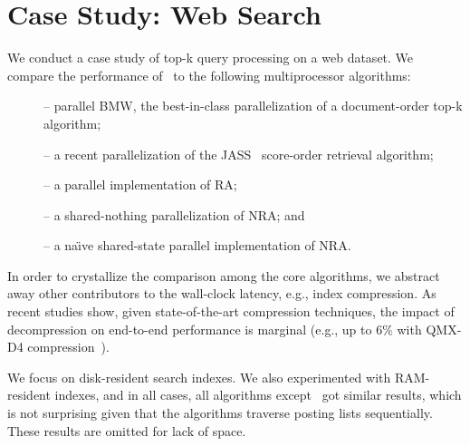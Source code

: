 \section{Case Study: Web Search} \label{sec:eval}

We conduct a case study of top-k query processing on a web dataset. 
We compare the performance of \alg\ to the following multiprocessor algorithms: 
\begin{description}
\item[\pBMW]\cite{rojas2013efficient} -- parallel BMW,  
the best-in-class parallelization of a document-order top-k algorithm; 
\item[\pJASS]\cite{parallel-jass} -- a recent parallelization of the JASS~\cite{Lin:2015} score-order retrieval algorithm; 
\item[\pRA]-- a parallel implementation of RA;
\item[\sNRA]--  a shared-nothing  parallelization of NRA; and 
\item [\pNRA]-- a
na\"{\i}ve shared-state parallel implementation of NRA. 
\end{description}



In order to crystallize the comparison among  the core algorithms, 
we abstract away other contributors to the wall-clock  latency, e.g., index compression. 
As recent studies show, given state-of-the-art compression techniques, the impact 
of decompression on end-to-end performance is marginal (e.g., up to $6\%$ with QMX-D4 compression~\cite{Lin:2017}).  

We focus on disk-resident search indexes. 
We also experimented with RAM-resident indexes, and in all cases, all algorithms except \pRA\ got similar results, which is not surprising given that the algorithms traverse posting lists sequentially. These results are omitted for lack of space.



